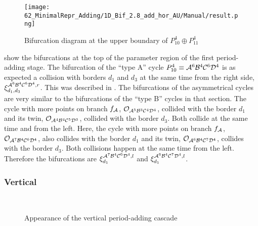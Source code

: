 \begin{figure}
    \centering
    \texttt{[image: 62\_MinimalRepr\_Adding/1D\_Bif\_2.8\_add\_hor\_AU/Manual/result.png]}
    \caption{Bifurcation diagram at the upper boundary of $P_{10}^4 \oplus P_{11}^4$}
    \label{fig:minrep.add.app.hor.bif.AU}
\end{figure}


 show the bifurcations at the top of the parameter region of the first period-adding stage.
The bifurcation of the ``type A'' cycle $P_{10}^4 \equiv \mathcal{A}^6\mathcal{B}^4\mathcal{C}^6\mathcal{D}^4$ is as expected a collision with borders $d_1$ and $d_3$ at the same time from the right side, $\xi_{d_1, d_3}^{\mathcal{A}^6\mathcal{B}^4\mathcal{C}^6\mathcal{D}^4, r}$.
This was described in .
The bifurcations of the asymmetrical cycles are very similar to the bifurcations of the ``type B'' cycles in that section.
The cycle with more points on branch $f_{\mathcal{A}}$, $\mathcal{O}_{\mathcal{A}^5\mathcal{B}^3\mathcal{C}^4\mathcal{D}^4}$, collided with the border $d_1$ and its twin, $\mathcal{O}_{\mathcal{A}^4\mathcal{B}^4\mathcal{C}^5\mathcal{D}^3}$, collided with the border $d_3$.
Both collide at the same time and from the left.
Here, the cycle with more points on branch $f_{\mathcal{A}}$, $\mathcal{O}_{\mathcal{A}^7\mathcal{B}^4\mathcal{C}^6\mathcal{D}^4}$, also collides with the border $d_1$ and its twin, $\mathcal{O}_{\mathcal{A}^6\mathcal{B}^4\mathcal{C}^7\mathcal{D}^4}$, collides with the border $d_3$.
Both collisions happen at the same time from the left.
Therefore the bifurcations are $\xi_{d_1}^{\mathcal{A}^7\mathcal{B}^4\mathcal{C}^6\mathcal{D}^4, l}$ and $\xi_{d_1}^{\mathcal{A}^6\mathcal{B}^4\mathcal{C}^7\mathcal{D}^4, l}$.

\subsubsection{Vertical}

\begin{figure}
    \centering
     \\
    \caption{Appearance of the vertical period-adding cascade}
    \label{fig:minrep.add.app.vert}
\end{figure}
